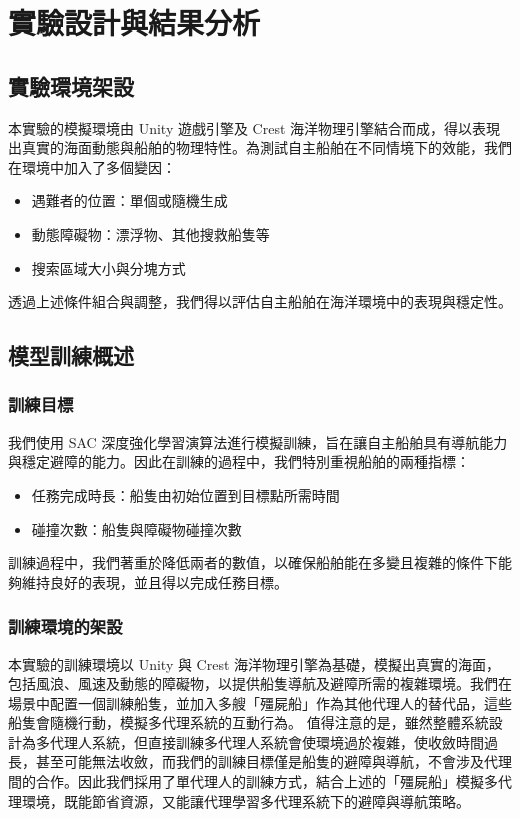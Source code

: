 \documentclass[12pt,a4paper]{article}
\begin{document}
\section{實驗設計與結果分析}

\subsection{實驗環境架設}
本實驗的模擬環境由 Unity 遊戲引擎及 Crest 海洋物理引擎結合而成，得以表現出真實的海面動態與船舶的物理特性。為測試自主船舶在不同情境下的效能，我們在環境中加入了多個變因：
\begin{itemize}
    \item 遇難者的位置：單個或隨機生成
    \item 動態障礙物：漂浮物、其他搜救船隻等
    \item 搜索區域大小與分塊方式
\end{itemize}
透過上述條件組合與調整，我們得以評估自主船舶在海洋環境中的表現與穩定性。

\subsection{模型訓練概述}
\subsubsection{訓練目標}
我們使用 SAC 深度強化學習演算法進行模擬訓練，旨在讓自主船舶具有導航能力與穩定避障的能力。因此在訓練的過程中，我們特別重視船舶的兩種指標：
\begin{itemize}
    \item 任務完成時長：船隻由初始位置到目標點所需時間
    \item 碰撞次數：船隻與障礙物碰撞次數
\end{itemize}
訓練過程中，我們著重於降低兩者的數值，以確保船舶能在多變且複雜的條件下能夠維持良好的表現，並且得以完成任務目標。

\subsubsection{訓練環境的架設}
本實驗的訓練環境以 Unity 與 Crest 海洋物理引擎為基礎，模擬出真實的海面，包括風浪、風速及動態的障礙物，以提供船隻導航及避障所需的複雜環境。我們在場景中配置一個訓練船隻，並加入多艘「殭屍船」作為其他代理人的替代品，這些船隻會隨機行動，模擬多代理系統的互動行為。
值得注意的是，雖然整體系統設計為多代理人系統，但直接訓練多代理人系統會使環境過於複雜，使收斂時間過長，甚至可能無法收斂，而我們的訓練目標僅是船隻的避障與導航，不會涉及代理間的合作。因此我們採用了單代理人的訓練方式，結合上述的「殭屍船」模擬多代理環境，既能節省資源，又能讓代理學習多代理系統下的避障與導航策略。
\end{document}
